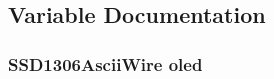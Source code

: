 \subsection{Variable Documentation}
\hypertarget{Blattdurchmesser_8ino_ad5f8b489b649f5974de70af2a799aee4}{
\subsubsection[{oled}]{\setlength{\rightskip}{0pt plus 5cm}S\-S\-D1306\-Ascii\-Wire oled}}\label{Blattdurchmesser_8ino_ad5f8b489b649f5974de70af2a799aee4}
